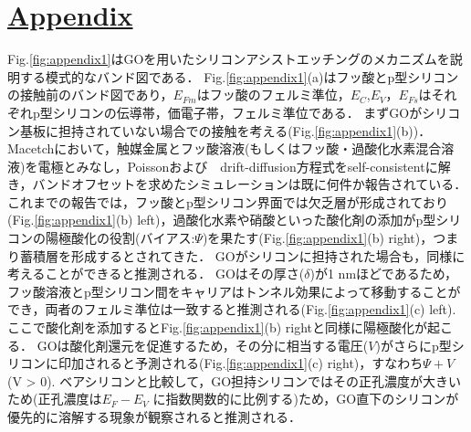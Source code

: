 \documentclass[platex,dvipdfmx]{jlreq}			%
\begin{document}
\section*{\ul{Appendix}}
Fig.\ref{fig:appendix1}はGOを用いたシリコンアシストエッチングのメカニズムを説明する模式的なバンド図である．
Fig.\ref{fig:appendix1}(a)はフッ酸とp型シリコンの接触前のバンド図であり，$E_{Fm}$はフッ酸のフェルミ準位，$E_{C}$,$E_{V}$，$E_{Fs}$はそれぞれp型シリコンの伝導帯，価電子帯，フェルミ準位である．
まずGOがシリコン基板に担持されていない場合での接触を考える(Fig.\ref{fig:appendix1}(b))．
Macetchにおいて，触媒金属とフッ酸溶液(もしくはフッ酸・過酸化水素混合溶液)を電極とみなし，Poissonおよび　drift-diffusion方程式をself-consistentに解き，バンドオフセットを求めたシミュレーションは既に何件か報告されている\supercite{torralba_tunable_2016, pinna_mesopore_2020, matsumoto_composite_2022}．
これまでの報告では，フッ酸とp型シリコン界面では欠乏層が形成されており(Fig.\ref{fig:appendix1}(b) left)，過酸化水素や硝酸といった酸化剤の添加がp型シリコンの陽極酸化の役割(バイアス:$\Psi$)を果たす(Fig.\ref{fig:appendix1}(b) right)，つまり蓄積層を形成するとされてきた\supercite{torralba_tunable_2016, pinna_mesopore_2020, matsumoto_composite_2022}．
\indent
GOがシリコンに担持された場合も，同様に考えることができると推測される．
GOはその厚さ($\delta$)が1 nmほどであるため，フッ酸溶液とp型シリコン間をキャリアはトンネル効果によって移動することができ，両者のフェルミ準位は一致すると推測される(Fig.\ref{fig:appendix1}(c) left).
ここで酸化剤を添加するとFig.\ref{fig:appendix1}(b) rightと同様に陽極酸化が起こる．
GOは酸化剤還元を促進するため\supercite{kubota_chemical_2019, kubota_chemical_2021}，その分に相当する電圧($V$)がさらにp型シリコンに印加されると予測される(Fig.\ref{fig:appendix1}(c) right)，すなわち$\Psi + V$ (V > 0).
ベアシリコンと比較して，GO担持シリコンではその正孔濃度が大きいため(正孔濃度は$E_F - E_V$ に指数関数的に比例する)ため，GO直下のシリコンが優先的に溶解する現象が観察されると推測される．
\end{document}
